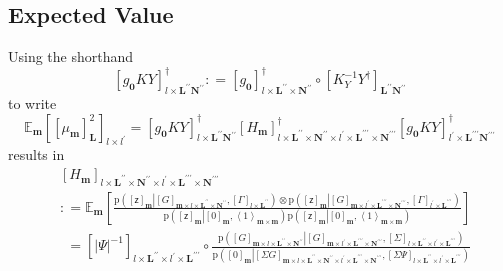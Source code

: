 \documentclass[preprint,12pt]{elsarticle}
\newcommand*{\M}[1]{\ensuremath{#1}\xspace}
\newcommand*{\x}{\times}
\newcommand*{\mi}[1]{\mathbf{#1}}
\newcommand*{\rv}[1]{\mathsf{#1}}
\newcommand*{\te}[2][]{\left\lbrack{#2}\right\rbrack_{#1}}
\newcommand*{\diag}[2][]{\left\langle{#2}\right\rangle_{#1}}
\newcommand*{\prob}[3]{\M{\mathrm{p}\!\left(\left.{#1}\right\vert{#2,#3}\right)}}
\newcommand*{\deq}{\M{\mathrel{\mathop:}=}}
\newcommand*{\ev}[3][]{\mathbb{E}_{#3}^{#1}\!\left\lbrack{#2}\right\rbrack}
\newcommand*{\evt}[3][]{\mathbb{E}_{#3}^{#1}\!#2}
\newcommand*{\modulus}[1]{\M{\left\lvert{#1}\right\rvert}}
\begin{document}
    \subsection{Expected Value}\label{sub:GPEst:Expectation}
    Using the shorthand
    \begin{equation*}
        \te[l\x\mi{L^{\prime\prime}}\mi{N^{\prime\prime}}]{g_{\mi{0}}KY}^{\dagger} \deq 
        \te[l\x\mi{L^{\prime\prime}}\x\mi{N^{\prime\prime}}]{g_{\mi{0}}}^{\dagger}
        \circ \te[\mi{L^{\prime\prime}}\mi{N^{\prime\prime}}]{K_{Y}^{-1} Y^{\dagger}}
    \end{equation*}
    to write
    \begin{equation*}                
        \evt{\te[l\x l^{\prime}]{\te[\mi{L}]{\mu_{\mi{m}}}^{2}}}{\mi{m}} 
        = \te[l\x\mi{L^{\prime\prime}}\mi{N^{\prime\prime}}]{g_{\mi{0}}KY}^{\dagger}
        \te[l\x\mi{L^{\prime\prime}}\x\mi{N^{\prime\prime}} \x l^{\prime}\x\mi{L^{\prime\prime\prime}}\x\mi{N^{\prime\prime\prime}}]{H_{\mi{m}}}^{\dagger}
        \te[l^{\prime}\x\mi{L^{\prime\prime\prime}}\mi{N^{\prime\prime\prime}}]{g_{\mi{0}}KY}^{\dagger}
    \end{equation*}
    results in
    \begin{align*}
        &\te[l\x\mi{L^{\prime\prime}}\x\mi{N^{\prime\prime}} \x l^{\prime}\x\mi{L^{\prime\prime\prime}}\x\mi{N^{\prime\prime\prime}}]{H_{\mi{m}}} \\
        &\deq \ev{\frac{
            \prob{\te[\mi{m}]{\rv{z}}}{\te[\mi{m}\x l\x \mi{L^{\prime\prime}\x N^{\prime\prime}}]{G}}{\te[l\x \mi{L^{\prime\prime}}]{\Gamma}} \otimes
            \prob{\te[\mi{m}]{\rv{z}}}{\te[\mi{m}\x l^{\prime}\x \mi{L^{\prime\prime\prime}\x N^{\prime\prime\prime}}]{G}}{\te[l^{\prime}\x\mi{L^{\prime\prime\prime}}]{\Gamma}}}
        {\prob{\te[\mi{m}]{\rv{z}}}{\te[\mi{m}]{0}}{\diag[\mi{m\x m}]{1}}
        \prob{\te[\mi{m}]{\rv{z}}}{\te[\mi{m}]{0}}{\diag[\mi{m\x m}]{1}}}}{\mi{m}} \\
        &\phantom{:}=
        \te[l\x \mi{L^{\prime\prime}}\x l^{\prime}\x \mi{L^{\prime\prime\prime}}]{\modulus{\Psi}^{-1}} \circ
        \frac{
            \prob{\te[\mi{m}\x l\x\mi{L^{\prime\prime}}\x\mi{N^{\prime\prime}}]{G}}
            {\te[\mi{m}\x l^{\prime}\x\mi{L^{\prime\prime\prime}}\x\mi{N^{\prime\prime\prime}}]{G}}
            {\te[l \x\mi{L^{\prime\prime}}\x l^{\prime}\x\mi{L^{\prime\prime\prime}}]{\Sigma}}
            }
        {\prob{\te[\mi{m}]{0}}
        {\te[\mi{m}\x l\x\mi{L^{\prime\prime}}\x\mi{N^{\prime\prime}}\x l^{\prime}\x\mi{L^{\prime\prime\prime}}\x\mi{N^{\prime\prime\prime}}]{\Sigma G}}{\te[l \x\mi{L^{\prime\prime}}\x l^{\prime}\x\mi{L^{\prime\prime\prime}}]{\Sigma\Psi}}}
    \end{align*}
\end{document}
